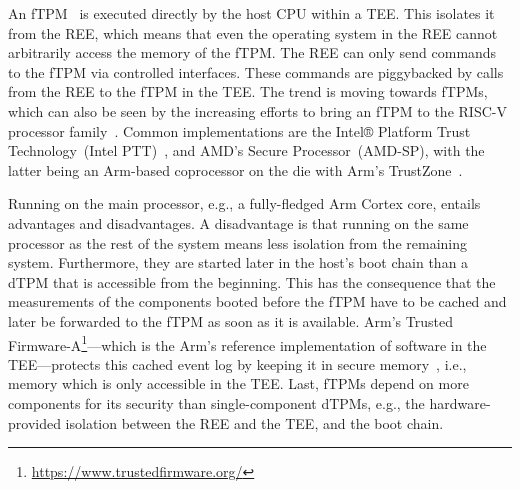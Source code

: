 

An fTPM~\cite{Raj2015, 197213} is executed directly by the host CPU within a \ac{TEE}.
This isolates it from the \ac{REE}, which means that even the operating system in the REE cannot arbitrarily access the memory of the fTPM\@.
The \ac{REE} can only send commands to the fTPM via controlled interfaces.
These commands are piggybacked by calls from the \ac{REE} to the fTPM in the \ac{TEE}.
The trend is moving towards fTPMs, which can also be seen by the increasing efforts to bring an fTPM to the RISC-V processor family~\cite{Boubakri2021}.
Common implementations are the Intel® Platform Trust Technology~(Intel PTT)~\cite{intelProcessorSecurity}, and AMD's Secure Processor~(AMD-SP), with the latter being an Arm-based coprocessor on the die with Arm's TrustZone~\cite{Khalid2020}.


Running on the main processor, e.g., a fully-fledged Arm Cortex core, entails advantages and disadvantages.
A disadvantage is that running on the same processor as the rest of the system means less isolation from the remaining system.
Furthermore, they are started later in the host's boot chain than a \ac{dTPM} that is accessible from the beginning.
This has the consequence that the measurements of the components booted before the fTPM have to be cached and later be forwarded to the \ac{fTPM} as soon as it is available.
Arm's Trusted Firmware-A\footnote{\url{https://www.trustedfirmware.org/}}---which is the Arm's reference implementation of software in the \ac{TEE}---protects this cached event log by keeping it in secure memory~\cite{tf-a-measured-boot}, i.e., memory which is only accessible in the \ac{TEE}. 
Last, fTPMs depend on more components for its security than single-component \acp{dTPM}, e.g., the hardware-provided isolation between the \ac{REE} and the \ac{TEE}, and the boot chain.

